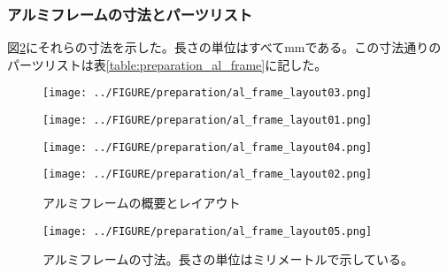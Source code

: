 \documentclass[../../main.tex]{subfiles}
\numberwithin{equation}{section}
\numberwithin{table}{section}
\numberwithin{figure}{section}
\begin{document}
  \subsubsection{アルミフレームの寸法とパーツリスト}
    図\ref{fig:preparation_al_frame_layout05}にそれらの寸法を示した。長さの単位はすべてmmである。この寸法通りのパーツリストは表\ref{table:preparation_al_frame}に記した。
    \begin{figure}[H]
      \begin{minipage}[b]{0.48\columnwidth}
        \centering
        \texttt{[image: ../FIGURE/preparation/al\_frame\_layout03.png]}
        \label{fig:preparation_al_frame_layout03}
      \end{minipage}
      \hspace{0.04\columnwidth} %
      \begin{minipage}[b]{0.48\columnwidth}
        \centering
        \texttt{[image: ../FIGURE/preparation/al\_frame\_layout01.png]}
        \label{fig:preparation_al_frame_layout01}
      \end{minipage}

      \begin{minipage}[b]{0.48\columnwidth}
        \centering
        \texttt{[image: ../FIGURE/preparation/al\_frame\_layout04.png]}
        \label{fig:preparation_al_frame_layout04}
      \end{minipage}
      \hspace{0.04\columnwidth} %
      \begin{minipage}[b]{0.48\columnwidth}
        \centering
        \texttt{[image: ../FIGURE/preparation/al\_frame\_layout02.png]}
        \label{fig:preparation_al_frame_layout02}
      \end{minipage}
      
      \caption{アルミフレームの概要とレイアウト}\label{fig:preparation_al_frame_layout}
    \end{figure}

    \begin{figure}[H]
      \centering
      \texttt{[image: ../FIGURE/preparation/al\_frame\_layout05.png]}
      \caption{アルミフレームの寸法。長さの単位はミリメートルで示している。}\label{fig:preparation_al_frame_layout05}
    \end{figure}
  
\end{document}
